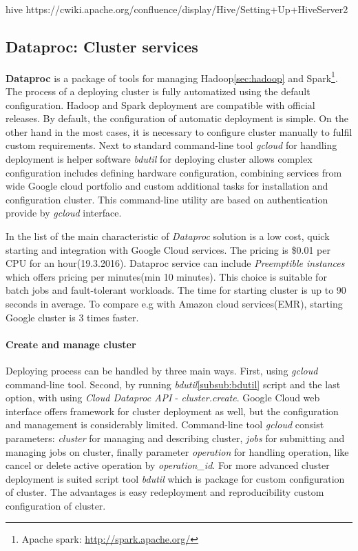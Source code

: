 \documentclass[a4paper,12pt,oneside]{report}
\begin{document}
hive
https://cwiki.apache.org/confluence/display/Hive/Setting+Up+HiveServer2

		\subsection{Dataproc: Cluster services}
		\label{subsub:dataproc}
\textbf{Dataproc} is a package of tools for managing Hadoop\ref{sec:hadoop} 
and Spark\footnote{Apache spark: \url{http://spark.apache.org/}}.
The process of a deploying cluster is fully automatized using the default 
configuration. Hadoop and Spark deployment are compatible with official
releases. By default, the configuration of automatic deployment is simple. 
On the other hand in the most cases, it is 
necessary to configure cluster manually to fulfil custom requirements. 
Next to standard command-line tool \textit{gcloud} for handling deployment is 
helper software \emph{bdutil} for deploying cluster allows complex 
configuration includes 
defining hardware configuration, combining services from wide Google cloud 
portfolio and custom additional tasks for installation and configuration cluster. 
This command-line utility are based on authentication provide by \textit{gcloud} interface.

In the list of the main characteristic of \textit{Dataproc} solution is a 
low cost, quick starting and integration with Google Cloud services. 
The pricing is  \$0.01 per CPU for an hour(19.3.2016). Dataproc service can 
include \textit{Preemptible instances} which offers pricing 
per minutes(min 10 minutes). This choice is suitable for batch jobs and 
fault-tolerant workloads. The time for starting cluster is up to 
90 seconds in average. To compare e.g with Amazon cloud services(EMR)\cite{amazon_emr}, 
starting Google cluster is 3 times faster.

\paragraph{Create and manage cluster} Deploying process can be handled by three main 
ways. First, using \textit{gcloud} command-line tool. Second, by running \textit{bdutil}\ref{subsub:bdutil} 
script and the last option, with using 
\textit{Cloud Dataproc API} - \textit{cluster.create}. Google Cloud web interface offers 
framework for cluster deployment as well, but the configuration and 
management is considerably limited. 
Command-line tool \textit{gcloud} consist parameters: \textit{cluster} for managing and 
describing cluster, \textit{jobs} for submitting 
and managing jobs on cluster, finally parameter \textit{operation} for handling operation, 
like cancel or delete active
 operation by \emph{operation\_id}. For more advanced cluster deployment is suited script 
 tool \textit{bdutil} which is 
 package for custom configuration of cluster. The advantages is easy redeployment and 
 reproducibility custom
  configuration of cluster. 
\end{document}
